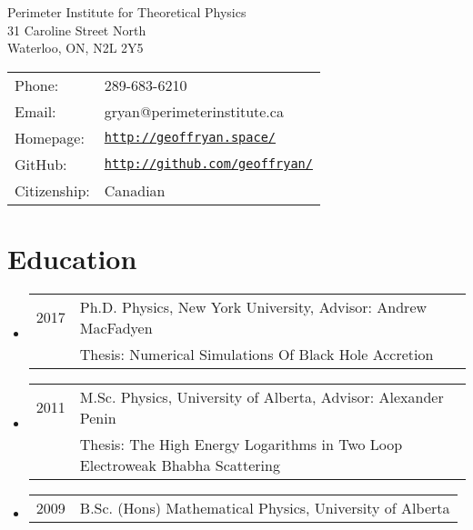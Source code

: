 {\huge \name}


\vspace{0.25in}

\begin{minipage}{0.45\linewidth}
  Perimeter Institute for Theoretical Physics \\
  31 Caroline Street North\\
  Waterloo, ON, N2L 2Y5
\end{minipage}
\begin{minipage}{0.45\linewidth}
  \begin{tabular}{ll}
    Phone: & 289-683-6210 \\
    Email: &  gryan@perimeterinstitute.ca \\
    Homepage: & \href{http://geoffryan.space/}{\tt http://geoffryan.space/} \\
    GitHub: & \href{http://github.com/geoffryan/}{\tt http://github.com/geoffryan/} \\
    Citizenship: &Canadian
  \end{tabular}
\end{minipage}

\section*{Education}
\begin{itemize}
\item \begin{tabular}{ll}
2017 & Ph.D. Physics, New York University, Advisor: Andrew MacFadyen \\
	& Thesis: Numerical Simulations Of Black Hole Accretion
\end{tabular}

\item \begin{tabular}{ll}
2011 &  M.Sc. Physics, University of Alberta, Advisor: Alexander Penin \\
	& Thesis: The High Energy Logarithms in Two Loop Electroweak Bhabha Scattering
\end{tabular}

\item \begin{tabular}{ll}
2009 &  B.Sc. (Hons) Mathematical Physics, University of Alberta \\
\end{tabular}
\end{itemize}

